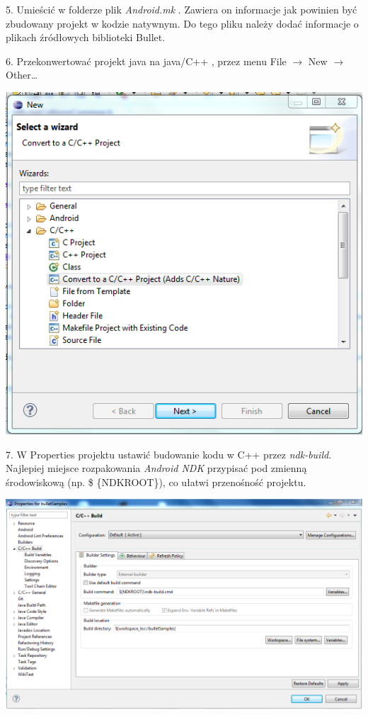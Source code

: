   5. Umieścić w folderze plik \emph{Android.mk} . Zawiera on informacje jak
  powinien być zbudowany projekt w kodzie natywnym. Do tego pliku należy
  dodać informacje o plikach źródłowych biblioteki Bullet.
  
  
  6. Przekonwertować projekt java na java/C++ , przez menu File $ \rightarrow $
  New $ \rightarrow $ Other\ldots
  
  \includegraphics{./img/convert.png}
  
  7. W Properties projektu ustawić budowanie kodu w C++ przez \emph{ndk-build}.
  Najlepiej miejsce rozpakowania \emph{Android NDK} przypisać pod zmienną
  środowiskową (np. \$ \{NDKROOT\}), co ułatwi przenośność projektu.
  
  \includegraphics[width=\textwidth]{./img/properties.png}
  
